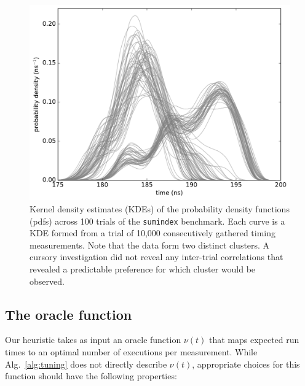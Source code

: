 \documentclass[conference]{IEEEtran}
\begin{document}
\begin{figure}
\centering
\includegraphics[width=\columnwidth]{figures/fig4/kde_pdf_sumindex}
\caption{Kernel density estimates (KDEs) of the probability density functions
(pdfs) across 100 trials of the \lstinline|sumindex| benchmark. Each curve is a
KDE formed from a trial of 10,000 consecutively gathered timing measurements.
Note that the data form two distinct clusters. A cursory investigation did not
reveal any inter-trial correlations that revealed a predictable preference for
which cluster would be observed.}
\label{fig:pdfsumindex}
\end{figure}



\subsection{The oracle function}
\label{sec:oracle}

Our heuristic takes as input an oracle function $\nu(t)$ that maps expected
run times to an optimal number of executions per measurement. While
Alg.~\ref{alg:tuning} does not directly describe $\nu(t)$, appropriate choices
for this function should have the following properties:
\end{document}
